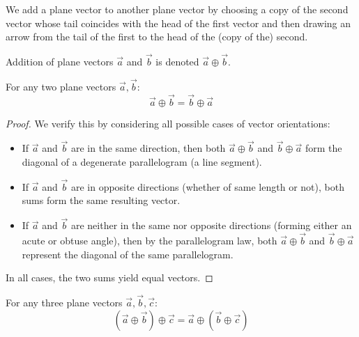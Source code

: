 \begin{definition}\label{def:vector-addition}
    We add a plane vector to another plane vector by choosing a copy of the second vector whose tail coincides with the head of the first vector and then drawing an arrow from the tail of the first to the head of the (copy of the) second.
\end{definition}

\begin{notation}
    Addition of plane vectors $\vec{a}$ and $\vec{b}$ is denoted $\vec{a} \oplus \vec{b}$.
\end{notation}

\begin{proposition}\label{prop:vector-addition-commutative}
    For any two plane vectors $\vec{a}, \vec{b}$:
    \[
    \vec{a} \oplus \vec{b} = \vec{b} \oplus \vec{a}
    \]
\end{proposition}

\begin{proof}
    We verify this by considering all possible cases of vector orientations:
    \begin{itemize}
        \item If $\vec{a}$ and $\vec{b}$ are in the same direction, then both $\vec{a} \oplus \vec{b}$ and $\vec{b} \oplus \vec{a}$ form the diagonal of a degenerate parallelogram (a line segment).
        \item If $\vec{a}$ and $\vec{b}$ are in opposite directions (whether of same length or not), both sums form the same resulting vector.
        \item If $\vec{a}$ and $\vec{b}$ are neither in the same nor opposite directions (forming either an acute or obtuse angle), then by the parallelogram law, both $\vec{a} \oplus \vec{b}$ and $\vec{b} \oplus \vec{a}$ represent the diagonal of the same parallelogram.
    \end{itemize}
    In all cases, the two sums yield equal vectors.
\end{proof}

\begin{proposition}\label{prop:vector-addition-associative}
    For any three plane vectors $\vec{a}, \vec{b}, \vec{c}$:
    \[
    (\vec{a} \oplus \vec{b}) \oplus \vec{c} = \vec{a} \oplus (\vec{b} \oplus \vec{c})
    \]
\end{proposition}

